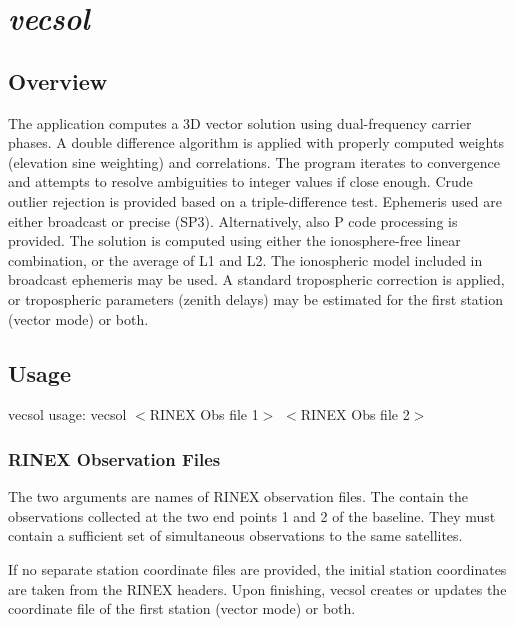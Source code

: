 %
%


\section{\emph{vecsol}}
\subsection{Overview}
The application computes a 3D vector solution using dual-frequency carrier phases. A double difference
algorithm is applied with properly computed weights (elevation sine weighting) and correlations. The program
iterates to convergence and attempts to resolve ambiguities to integer values if close enough. Crude outlier rejection
is provided based on a triple-difference test. Ephemeris used are either broadcast or precise (SP3). Alternatively, also P code
processing is provided.
The solution is computed using either the ionosphere-free linear
combination, or the average of L1 and L2. The ionospheric model included
in broadcast ephemeris may be used. A standard tropospheric correction
is applied, or tropospheric parameters (zenith delays) may be estimated
for the first station (vector mode) or both.

\subsection{Usage}
\begin{\outputsize}
vecsol usage: vecsol $<$RINEX Obs file 1$>$ $<$RINEX Obs file 2$>$
\end{\outputsize}

\subsubsection{RINEX Observation Files}
The two arguments are names of RINEX observation files. The contain the observations collected at the two end points 1 and 2 of the baseline.
They must contain a sufficient set of simultaneous observations to the same satellites.

If no separate station coordinate files are provided, the initial
station coordinates are taken from the RINEX headers. Upon finishing,
vecsol creates or updates the coordinate file of the first station
(vector mode) or both.

